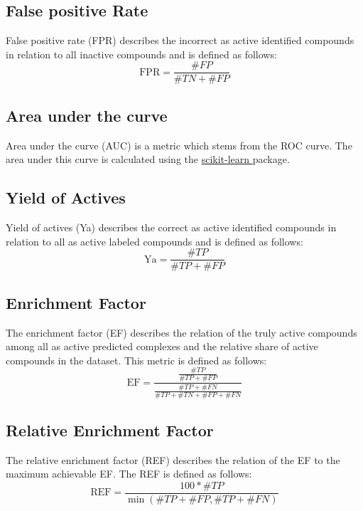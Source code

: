 \subsection{False positive Rate}\label{fpr}
False positive rate (FPR) describes the incorrect as active identified compounds in relation to all inactive compounds and is defined as follows:
\begin{equation*}
    \text{FPR} = \frac{\#FP}{\#TN+\#FP}
\end{equation*}
\cite[]{Lopes2017}
\subsection{Area under the curve}
Area under the curve (AUC) is a metric which stems from the ROC curve. 
The area under this curve is calculated using the \href{https://scikit-learn.org/stable/index.html}{scikit-learn
} package. 
\subsection{Yield of Actives}
Yield of actives (Ya) describes the correct as active identified compounds in relation to all as active labeled compounds and is defined as follows:
\begin{equation*}
    \text{Ya} = \frac{\#TP}{\#TP+\#FP}
\end{equation*}
\cite[]{Giordano2022}
\subsection{Enrichment Factor}
The enrichment factor (EF) describes the relation of the truly active compounds among all as active predicted complexes and the relative share of active compounds in the dataset.
This metric is defined as follows:
\begin{equation*}
    \text{EF} = \frac{\frac{\#TP}{\#TP+\#FP}}{\frac{\#TP+\#FN}{\#TP+\#TN+\#FP+\#FN}}
\end{equation*}
\cite[]{Lopes2017}  
\subsection{Relative Enrichment Factor}
The relative enrichment factor (REF) describes the relation of the EF to the maximum achievable EF. The REF is defined as follows:
\begin{equation*}
    \text{REF} = \frac{100 *\#TP}{\min(\#TP + \#FP,\#TP+\#FN)}
\end{equation*} 
\cite[]{Lopes2017}  

